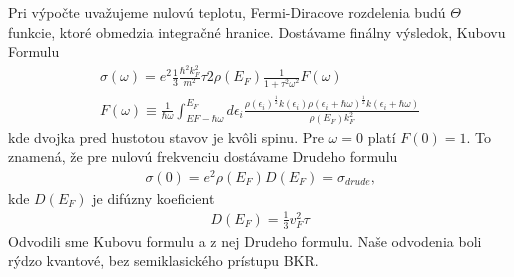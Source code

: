 Pri výpočte uvažujeme nulovú teplotu, Fermi-Diracove rozdelenia budú $\Theta$ funkcie, ktoré obmedzia integračné hranice. Dostávame finálny výsledok, Kubovu Formulu
\begin{align}
\label{eq:03kubo}
\sigma(\omega)=e^2\frac{1}{3}\frac{\hbar^2k_F^2}{m^2}\tau 2\rho(E_F)\frac{1}{1+\tau^2\omega^2}F(\omega)\\
F(\omega)\equiv\frac{1}{\hbar\omega}\int_{EF-\hbar\omega}^{E_F}d\epsilon_i \frac{\rho(\epsilon_i)^{\frac{1}{2}}k(\epsilon_i)\rho(\epsilon_i+\hbar\omega)^{\frac{1}{2}}k(\epsilon_i+\hbar\omega)}{\rho(E_F)k_F^2}
\end{align}
kde dvojka pred hustotou stavov je kvôli spinu. Pre $\omega=0$ platí $F(0)=1$. To znamená, že pre nulovú frekvenciu dostávame Drudeho formulu
\begin{align}
\sigma(0)=e^2\rho(E_F)D(E_F)=\sigma_{drude} \text{,}
\end{align}
kde $D(E_F)$ je difúzny koeficient
\begin{align}
D(E_F)=\frac{1}{3}v_F^2\tau
\end{align}
Odvodili sme Kubovu formulu a z nej Drudeho formulu. Naše odvodenia boli rýdzo kvantové, bez semiklasického prístupu BKR. 